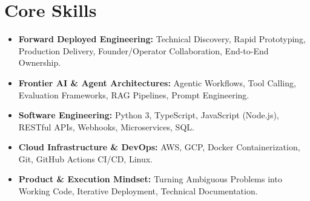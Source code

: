 \documentclass[a4paper,10pt]{article}
\begin{document}
\section{Core Skills}
\begin{itemize}
  \item \textbf{Forward Deployed Engineering:} Technical Discovery, Rapid Prototyping, Production Delivery, Founder/Operator Collaboration, End-to-End Ownership.
  \item \textbf{Frontier AI \& Agent Architectures:} Agentic Workflows, Tool Calling, Evaluation Frameworks, RAG Pipelines, Prompt Engineering.
  \item \textbf{Software Engineering:} Python 3, TypeScript, JavaScript (Node.js), RESTful APIs, Webhooks, Microservices, SQL.
  \item \textbf{Cloud Infrastructure \& DevOps:} AWS, GCP, Docker Containerization, Git, GitHub Actions CI/CD, Linux.
  \item \textbf{Product \& Execution Mindset:} Turning Ambiguous Problems into Working Code, Iterative Deployment, Technical Documentation.
\end{itemize}
\end{document}
